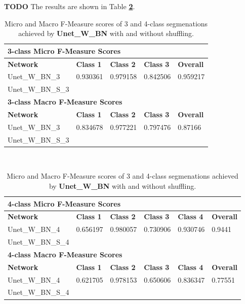 \textbf{TODO} The results are shown in Table \textbf{\ref{tab:results3}}. \\


\begin {table}
	\begin{flushleft}
		\begin {tabular}[!ht]{|l|l|l|l|l|}
			\hline\multicolumn{5}{|l|}{\textbf{3-class Micro F-Measure Scores}} \\ \hline
			\textbf{Network}& \textbf{Class 1}& \textbf{Class 2}& \textbf{Class 3}& \textbf{Overall} \\ \hline
			Unet\_W\_BN\_3& 0.930361&  0.979158& 0.842506& 0.959217\\ \hline
			Unet\_W\_BN\_S\_3& &  & & \\ \hline
			\multicolumn{5}{|l|}{\textbf{3-class Macro F-Measure Scores}} \\ \hline
			\textbf{Network}& \textbf{Class 1}& \textbf{Class 2}& \textbf{Class 3}& \textbf{Overall} \\ \hline
			Unet\_W\_BN\_3& 0.834678& 0.977221& 0.797476& 0.87166\\ \hline
			Unet\_W\_BN\_S\_3& & & & \\ \hline
		\end {tabular}
		\vspace{0.5cm}\\
		\begin {tabular}[!ht]{|l|l|l|l|l|l|}
			\hline\multicolumn{6}{|l|}{\textbf{4-class Micro F-Measure Scores}} \\ \hline
			\textbf{Network}& \textbf{Class 1}& \textbf{Class 2}& \textbf{Class 3}& \textbf{Class 4}& \textbf{Overall} \\ \hline
			Unet\_W\_BN\_4& 0.656197& 0.980057& 0.730906& 0.930746& 0.9441\\ \hline
			Unet\_W\_BN\_S\_4& & & & & \\ \hline
			\multicolumn{6}{|l|}{\textbf{4-class Macro F-Measure Scores}} \\ \hline
			\textbf{Network}& \textbf{Class 1}& \textbf{Class 2}& \textbf{Class 3}& \textbf{Class 4}& \textbf{Overall} \\ \hline
			Unet\_W\_BN\_4& 0.621705& 0.978153& 0.650606& 0.836347& 0.77551\\ \hline
			Unet\_W\_BN\_S\_4& & & & & \\ \hline
		\end {tabular}
	\end {flushleft}

\caption[Micro and Macro F-Measure scores for a network with Batch Normalization and with or without shuffling.]{Micro and Macro F-Measure scores of 3 and 4-class segmenations achieved by \textbf{Unet\_W\_BN} with and without shuffling.}
\label{tab:results3}
\end {table}


